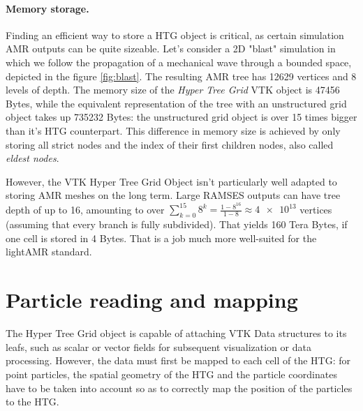 \documentclass[
	a4paper,
	12pt,
	raggedright,
	twoside
]{tufte-style-article}
\theoremstyle{definition}
\theoremstyle{remark}
\begin{document}
\begin{figure}[btp]
    \centering
\end{figure}

\paragraph{Memory storage.} Finding an efficient way to store a \Gls{HTG} object is critical, as certain simulation \Gls{AMR} outputs can be quite sizeable. Let's consider a 2D "blast" simulation in which we follow the propagation of a mechanical wave through a bounded space, depicted in the figure \ref{fig:blast}. The resulting \Gls{AMR} tree has 12629 vertices and 8 levels of depth. The memory size of the \textit{Hyper Tree Grid} \Gls{VTK} object is 47456 Bytes, while the equivalent representation of the tree with an unstructured grid object takes up 735232 Bytes: the unstructured grid object is over 15 times bigger than it's \Gls{HTG} counterpart. This difference in memory size is achieved by only storing all strict nodes and the index of their first children nodes, also called \textit{eldest nodes}.

However, the \Gls{VTK} Hyper Tree Grid Object isn't particularly well adapted to storing \Gls{AMR} meshes on the long term. Large RAMSES outputs can have tree depth of up to 16, amounting to over $\sum_{k=0}^{15} 8^k = \frac{1-8^{16}}{1-8} \approx \num{4e13}$ vertices (assuming that every branch is fully subdivided). That yields \num{160} Tera Bytes, if one cell is stored in 4 Bytes. That is a job much more well-suited for the light\Gls{AMR} standard.

\section{Particle reading and mapping}
The Hyper Tree Grid object is capable of attaching \Gls{VTK} Data structures to its leafs, such as scalar or vector fields for subsequent visualization or data processing. However, the data must first be mapped to each cell of the \Gls{HTG}: for point particles, the spatial geometry of the \Gls{HTG} and the particle coordinates have to be taken into account so as to correctly map the position of the particles to the \Gls{HTG}.
\end{document}
